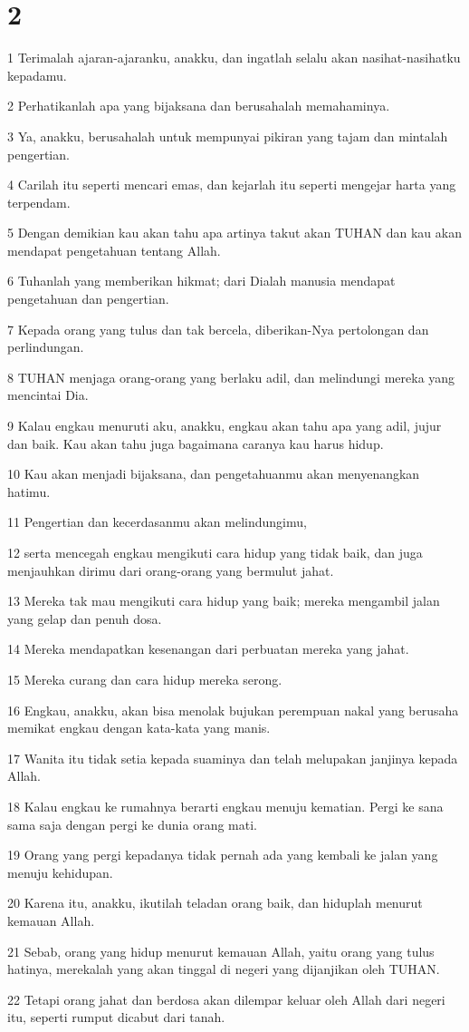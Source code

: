 \chapter{2}

\par 1 Terimalah ajaran-ajaranku, anakku, dan ingatlah selalu akan nasihat-nasihatku kepadamu.
\par 2 Perhatikanlah apa yang bijaksana dan berusahalah memahaminya.
\par 3 Ya, anakku, berusahalah untuk mempunyai pikiran yang tajam dan mintalah pengertian.
\par 4 Carilah itu seperti mencari emas, dan kejarlah itu seperti mengejar harta yang terpendam.
\par 5 Dengan demikian kau akan tahu apa artinya takut akan TUHAN dan kau akan mendapat pengetahuan tentang Allah.
\par 6 Tuhanlah yang memberikan hikmat; dari Dialah manusia mendapat pengetahuan dan pengertian.
\par 7 Kepada orang yang tulus dan tak bercela, diberikan-Nya pertolongan dan perlindungan.
\par 8 TUHAN menjaga orang-orang yang berlaku adil, dan melindungi mereka yang mencintai Dia.
\par 9 Kalau engkau menuruti aku, anakku, engkau akan tahu apa yang adil, jujur dan baik. Kau akan tahu juga bagaimana caranya kau harus hidup.
\par 10 Kau akan menjadi bijaksana, dan pengetahuanmu akan menyenangkan hatimu.
\par 11 Pengertian dan kecerdasanmu akan melindungimu,
\par 12 serta mencegah engkau mengikuti cara hidup yang tidak baik, dan juga menjauhkan dirimu dari orang-orang yang bermulut jahat.
\par 13 Mereka tak mau mengikuti cara hidup yang baik; mereka mengambil jalan yang gelap dan penuh dosa.
\par 14 Mereka mendapatkan kesenangan dari perbuatan mereka yang jahat.
\par 15 Mereka curang dan cara hidup mereka serong.
\par 16 Engkau, anakku, akan bisa menolak bujukan perempuan nakal yang berusaha memikat engkau dengan kata-kata yang manis.
\par 17 Wanita itu tidak setia kepada suaminya dan telah melupakan janjinya kepada Allah.
\par 18 Kalau engkau ke rumahnya berarti engkau menuju kematian. Pergi ke sana sama saja dengan pergi ke dunia orang mati.
\par 19 Orang yang pergi kepadanya tidak pernah ada yang kembali ke jalan yang menuju kehidupan.
\par 20 Karena itu, anakku, ikutilah teladan orang baik, dan hiduplah menurut kemauan Allah.
\par 21 Sebab, orang yang hidup menurut kemauan Allah, yaitu orang yang tulus hatinya, merekalah yang akan tinggal di negeri yang dijanjikan oleh TUHAN.
\par 22 Tetapi orang jahat dan berdosa akan dilempar keluar oleh Allah dari negeri itu, seperti rumput dicabut dari tanah.


